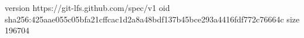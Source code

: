 version https://git-lfs.github.com/spec/v1
oid sha256:425aae055c05bfa21cffcac1d2a8a48bdf137b45bce293a4416fdf772c76664c
size 196704
